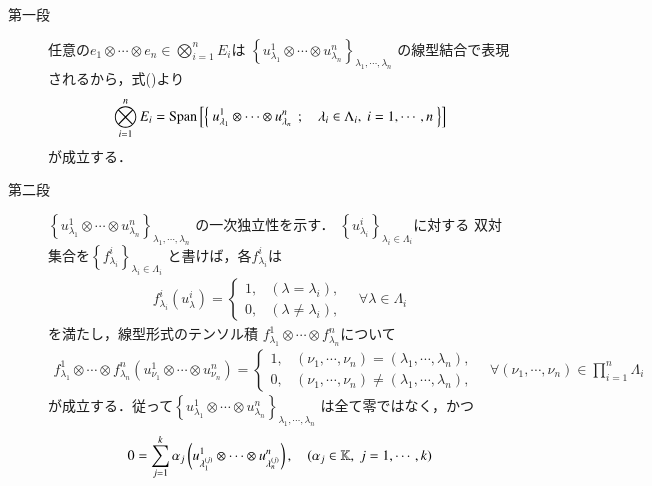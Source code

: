 	\begin{prf}\mbox{}
		\begin{description}
			\item[第一段]
				任意の$e_1 \otimes \cdots \otimes e_n \in \bigotimes_{i=1}^n E_i$は
				$\left\{ u^1_{\lambda_1} \otimes \cdots \otimes u^n_{\lambda_n} 
				\right\}_{\lambda_1,\cdots,\lambda_n}$
				の線型結合で表現されるから，式()より
				\begin{align}
					\bigotimes_{i=1}^n E_i = \mathrm{Span}\left[ \left\{\ u^1_{\lambda_1} \otimes 
				\cdots \otimes u^n_{\lambda_n}\ \, ; \quad \lambda_i \in \Lambda_i,\ i=1,\cdots,n\ \right\} \right]
				\end{align}
				が成立する．
				
			\item[第二段]
				$\left\{ u^1_{\lambda_1} \otimes 
				\cdots \otimes u^n_{\lambda_n} \right\}_{\lambda_1,\cdots,\lambda_n}$
				の一次独立性を示す．
				$\left\{ u^i_{\lambda_i} \right\}_{\lambda_i \in \Lambda_i}$に対する
				双対集合を$\left\{ f^i_{\lambda_i} \right\}_{\lambda_i \in \Lambda_i}$
				と書けば，各$f^i_{\lambda_i}$は
				\begin{align}
					f^i_{\lambda_i}(u^i_\lambda) =
					\begin{cases}
						1, & (\lambda = \lambda_i), \\
						0, & (\lambda \neq \lambda_i),
					\end{cases}
					\quad \forall \lambda \in \Lambda_i
				\end{align}
				を満たし，線型形式のテンソル積
				$f^1_{\lambda_1} \otimes \cdots \otimes f^n_{\lambda_n}$について
				\begin{align}
					f^1_{\lambda_1} \otimes \cdots \otimes f^n_{\lambda_n}(u^1_{\nu_1} \otimes 
					\cdots \otimes u^n_{\nu_n}) = 
					\begin{cases}
						1, & (\nu_1,\cdots,\nu_n) = (\lambda_1,\cdots,\lambda_n), \\
						0, & (\nu_1,\cdots,\nu_n) \neq (\lambda_1,\cdots,\lambda_n),
					\end{cases}
					\quad \forall (\nu_1,\cdots,\nu_n) \in \prod_{i=1}^n \Lambda_i
				\end{align}
				が成立する．従って$\left\{ u^1_{\lambda_1} \otimes 
				\cdots \otimes u^n_{\lambda_n} \right\}_{\lambda_1,\cdots,\lambda_n}$
				は全て零ではなく，かつ
				\begin{align}
					0 = \sum_{j=1}^k \alpha_j \left(u^1_{\lambda^{(j)}_1} \otimes 
					\cdots \otimes u^n_{\lambda^{(j)}_n} \right),
					\quad (\alpha_j \in \K,\ j=1,\cdots,k)

\end{align}
\end{description}
\end{prf}
